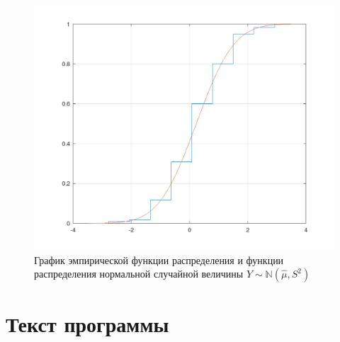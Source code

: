 \begin{figure}
	\centering
	\includegraphics[width=\linewidth]{img/screenshot003}
	\caption{График эмпирической функции распределения и функции распределения нормальной случайной величины $Y\sim\mathbb{N}(\hat{\mu}, S^2)$}
	\label{fig:screenshot003}
\end{figure}

\clearpage

\section{Текст программы}

